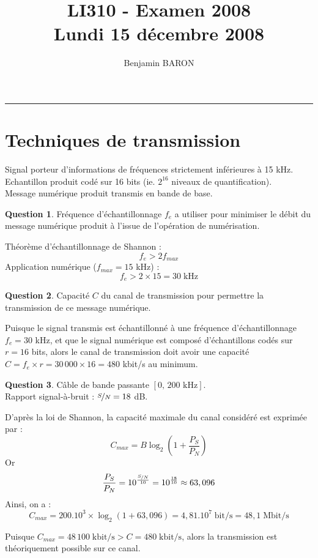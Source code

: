 \documentclass[11pt,english,french]{scrreprt}
\makeatletter
\theoremstyle{remark}
\theoremstyle{definition}
\newtheorem{ques}{Question}[section]
\renewcommand{\maketitle}{\begingroup%
    \let\footnotesize\small
    \let\footnoterule\relax
    \parindent \z@
    \reset@font
    \begin{flushleft}
      \huge \sffamily \bfseries\color{orange} \@title
    \end{flushleft}
    \hrule height 1pt
    \begin{flushright}
      \large\sffamily\color{MyDarkBlue}\@author
    \end{flushright}
  \endgroup%
  \setcounter{footnote}{0}%
}
\makeatother
\begin{document}
	
\title{LI310 - Examen 2008\\
Lundi 15 décembre 2008}
\author{Benjamin BARON}

\maketitle

\section{Techniques de transmission} %

Signal porteur d'informations de fréquences strictement inférieures à 15 kHz.\\
Echantillon produit codé sur 16 bits (ie. $2^{16}$ niveaux de quantification).\\
Message numérique produit transmis en bande de base.

\begin{ques}
	Fréquence d'échantillonnage $f_e$ a utiliser pour minimiser le débit du message numérique produit à l'issue de l'opération de numérisation.
	
	Théorème d'échantillonnage de Shannon :\[f_e > 2f_{max}\]
	Application numérique ($f_{max} = 15$ kHz) :\[f_e > 2\times 15 = 30\;\textrm{kHz}\]
\end{ques}

\begin{ques}\label{ques:2}
	Capacité $C$ du canal de transmission pour permettre la transmission de ce message numérique.
	
	Puisque le signal transmis est échantillonné à une fréquence d'échantillonnage $f_e=30$ kHz, et que le signal numérique est composé d'échantillons codés sur $r = 16$ bits, alors le canal de transmission doit avoir une capacité $C=f_e\times r=30\,000\times 16=480$ kbit/s au minimum.
\end{ques}


\begin{ques}
	Câble de bande passante $[0,\,200\textrm{ kHz}]$.\\
	Rapport signal-à-bruit : $\nicefrac{S}{N}=18$ dB.
	
	D'après la loi de Shannon, la capacité maximale du canal considéré est exprimée par :\[C_{max}=B\log_2\left(1+\frac{P_S}{P_N}\right)\]
	Or \[\frac{P_S}{P_N}=10^{\frac{\nicefrac{S}{N}}{10}}= 10^{\frac{18}{10}}\approx 63,096\]
	Ainsi, on a :\[C_{max}=200.10^3\times \log_2(1+63,096)=4,81.10^7\;\textrm{bit/s}=48,1\;\textrm{Mbit/s}\]
	
	Puisque $C_{max}=48\,100\;\textrm{kbit/s}>C=480\;\textrm{kbit/s}$, alors la transmission est théoriquement possible sur ce canal.
\end{ques}
\end{document}
